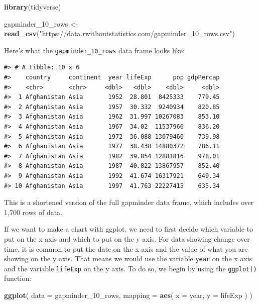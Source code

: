 \documentclass[
]{book}
\newenvironment{Shaded}{\begin{snugshade}}{\end{snugshade}}
\newcommand{\AttributeTok}[1]{\textcolor[rgb]{0.13,0.29,0.53}{#1}}
\newcommand{\FunctionTok}[1]{\textcolor[rgb]{0.13,0.29,0.53}{\textbf{#1}}}
\newcommand{\NormalTok}[1]{#1}
\newcommand{\OtherTok}[1]{\textcolor[rgb]{0.56,0.35,0.01}{#1}}
\newcommand{\StringTok}[1]{\textcolor[rgb]{0.31,0.60,0.02}{#1}}
\begin{document}
\begin{Shaded}
\begin{Highlighting}[]
\FunctionTok{library}\NormalTok{(tidyverse)}

\NormalTok{gapminder\_10\_rows }\OtherTok{\textless{}{-}} \FunctionTok{read\_csv}\NormalTok{(}\StringTok{"https://data.rwithoutstatistics.com/gapminder\_10\_rows.csv"}\NormalTok{)}
\end{Highlighting}
\end{Shaded}

Here's what the \texttt{gapminder\_10\_rows} data frame looks like:

\begin{verbatim}
#> # A tibble: 10 x 6
#>    country     continent  year lifeExp      pop gdpPercap
#>    <chr>       <chr>     <dbl>   <dbl>    <dbl>     <dbl>
#>  1 Afghanistan Asia       1952  28.801  8425333    779.45
#>  2 Afghanistan Asia       1957  30.332  9240934    820.85
#>  3 Afghanistan Asia       1962  31.997 10267083    853.10
#>  4 Afghanistan Asia       1967  34.02  11537966    836.20
#>  5 Afghanistan Asia       1972  36.088 13079460    739.98
#>  6 Afghanistan Asia       1977  38.438 14880372    786.11
#>  7 Afghanistan Asia       1982  39.854 12881816    978.01
#>  8 Afghanistan Asia       1987  40.822 13867957    852.40
#>  9 Afghanistan Asia       1992  41.674 16317921    649.34
#> 10 Afghanistan Asia       1997  41.763 22227415    635.34
\end{verbatim}

This is a shortened version of the full gapminder data frame, which includes over 1,700 rows of data.

If we want to make a chart with ggplot, we need to first decide which variable to put on the x axis and which to put on the y axis. For data showing change over time, it is common to put the date on the x axis and the value of what you are showing on the y axis. That means we would use the variable \texttt{year} on the x axis and the variable \texttt{lifeExp} on the y axis. To do so, we begin by using the \texttt{ggplot()} function:

\begin{Shaded}
\begin{Highlighting}[]
\FunctionTok{ggplot}\NormalTok{(}
  \AttributeTok{data =}\NormalTok{ gapminder\_10\_rows,}
  \AttributeTok{mapping =} \FunctionTok{aes}\NormalTok{(}
    \AttributeTok{x =}\NormalTok{ year,}
    \AttributeTok{y =}\NormalTok{ lifeExp}
\NormalTok{  )}
\NormalTok{)}
\end{Highlighting}
\end{Shaded}
\end{document}
